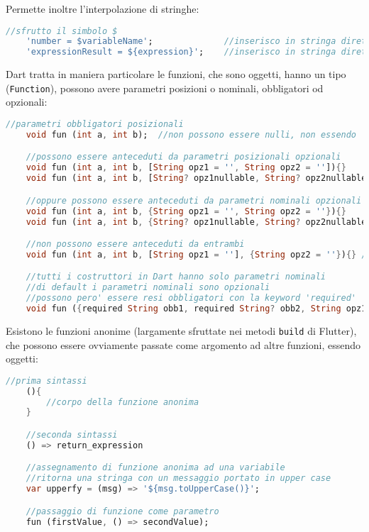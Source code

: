 Permette inoltre l'interpolazione di stringhe:

\begin{lstlisting}[language=dart, firstnumber=1,caption={Dart interpolazone stringhe}]
    //sfrutto il simbolo $
    'number = $variableName';              //inserisco in stringa direttamente una variabile
    'expressionResult = ${expression}';    //inserisco in stringa direttamente un'espressione
\end{lstlisting}

Dart tratta in maniera particolare le funzioni, che sono oggetti, hanno un tipo (\verb+Function+), possono avere parametri posizioni o nominali, obbligatori od opzionali: 

\begin{lstlisting}[language=dart, firstnumber=1,caption={Dart parametri funzioni}]
    //parametri obbligatori posizionali
    void fun (int a, int b);  //non possono essere nulli, non essendo 'int? a'

    //possono essere anteceduti da parametri posizionali opzionali
    void fun (int a, int b, [String opz1 = '', String opz2 = '']){}
    void fun (int a, int b, [String? opz1nullable, String? opz2nullable]){}

    //oppure possono essere anteceduti da parametri nominali opzionali
    void fun (int a, int b, {String opz1 = '', String opz2 = ''}){}
    void fun (int a, int b, {String? opz1nullable, String? opz2nullable}){}

    //non possono essere anteceduti da entrambi
    void fun (int a, int b, [String opz1 = ''], {String opz2 = ''}){} //compile error

    //tutti i costruttori in Dart hanno solo parametri nominali
    //di default i parametri nominali sono opzionali
    //possono pero' essere resi obbligatori con la keyword 'required'
    void fun ({required String obb1, required String? obb2, String opz1 = ''}){}
\end{lstlisting}

Esistono le funzioni anonime (largamente sfruttate nei metodi \verb+build+ di Flutter), che possono essere ovviamente passate come argomento ad altre funzioni, essendo oggetti:

\begin{lstlisting}[language=dart, firstnumber=1,caption={Dart funzioni anonime}]
    //prima sintassi
    (){
        //corpo della funzione anonima
    } 

    //seconda sintassi
    () => return_expression

    //assegnamento di funzione anonima ad una variabile
    //ritorna una stringa con un messaggio portato in upper case
    var upperfy = (msg) => '${msg.toUpperCase()}';

    //passaggio di funzione come parametro
    fun (firstValue, () => secondValue);
\end{lstlisting}

